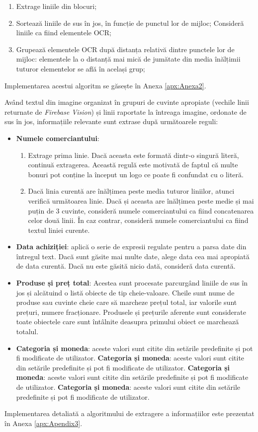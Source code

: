 \begin{enumerate}
  \item
  Extrage liniile din blocuri;
  \item
  Sortează liniile de sus în jos, în funcție de punctul lor de mijloc; Consideră liniile ca fiind elementele OCR;
  \item
  Grupează elementele OCR după distanța relativă dintre punctele lor de mijloc: elementele la o distanță mai mică de jumătate din media înălțimii tuturor elementelor se află în același grup;
\end{enumerate}

Implementarea acestui algoritm se găsește în Anexa \ref{apx:Anexa2}.

Având textul din imagine organizat în grupuri de cuvinte apropiate (vechile linii returnate de \emph{Firebase Vision}) și linii raportate la întreaga imagine, ordonate de sus în jos, informațiile relevante sunt extrase după următoarele reguli:

\begin{itemize}
  \item
  \textbf{Numele comerciantului}:
  \begin{enumerate}
      \item
      Extrage prima linie. Dacă aceasta este formată dintr-o singură literă, continuă extragerea. Această regulă este motivată de faptul că multe bonuri pot conține la început un logo ce poate fi confundat cu o literă.
      \item
      Dacă linia curentă are înălțimea peste media tuturor liniilor, atunci verifică următoarea linie. Dacă și aceasta are înălțimea peste medie și mai puțin de 3 cuvinte, consideră numele comerciantului ca fiind concatenarea celor două linii. În caz contrar, consideră numele comerciantului ca fiind textul liniei curente.
  \end{enumerate}
  \item
  \textbf{Data achiziției}: aplică o serie de expresii regulate pentru a parsa date din întregul text. Dacă sunt găsite mai multe date, alege data cea mai apropiată de data curentă. Dacă nu este găsită nicio dată, consideră data curentă.
  \item
  \textbf{Produse și preț total}: Acestea sunt procesate parcurgând liniile de sus în jos și alcătuind o listă obiecte de tip cheie-valoare. Cheile sunt nume de produse sau cuvinte cheie care să marcheze prețul total, iar valorile sunt prețuri, numere fracționare. Produsele și prețurile aferente sunt considerate toate obiectele care sunt întâlnite deasupra primului obiect ce marchează totalul.
  \item
  \textbf{Categoria și moneda}: aceste valori sunt citite din setările predefinite și pot fi modificate de utilizator.
  \textbf{Categoria și moneda}: aceste valori sunt citite din setările predefinite și pot fi modificate de utilizator.
  \textbf{Categoria și moneda}: aceste valori sunt citite din setările predefinite și pot fi modificate de utilizator.
  \textbf{Categoria și moneda}: aceste valori sunt citite din setările predefinite și pot fi modificate de utilizator.
\end{itemize}

Implementarea detaliată a algoritmului de extragere a informațiilor este prezentat în Anexa \ref{apx:Apendix3}.


